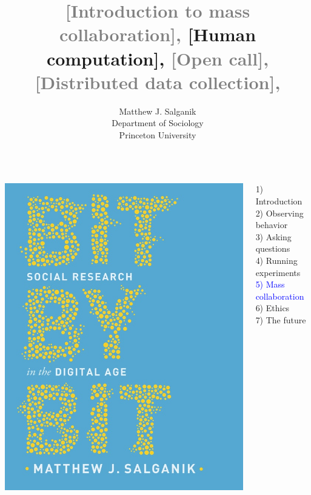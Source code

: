 \documentclass[aspectratio=169]{beamer}
\title[]{\textcolor{gray}{[Introduction to mass collaboration],} [Human computation], \textcolor{gray}{[Open call], [Distributed data collection], \newline [Fragile Families Challenge]}}
\author[]{Matthew J. Salganik\\Department of Sociology\\Princeton University}
\date[]{%
\begin{flushright}
\texttt{[image: figures/cc-by.png]}
\end{flushright}
}
\begin{document}
\frame{\titlepage}
\begin{frame}

\begin{columns}
\begin{column}{.40\textwidth}
\includegraphics[width=\textwidth]{figures/salganik_bit_2018_cover}
\end{column}%

\hfill%

\begin{column}{.60\textwidth}
1) Introduction \\
2) Observing behavior \\
3) Asking questions \\
4) Running experiments \\
\textcolor{blue}{5) Mass collaboration} \\
6) Ethics \\
7) The future \\
\end{column}%
\end{columns}

\end{frame}
\end{document}
